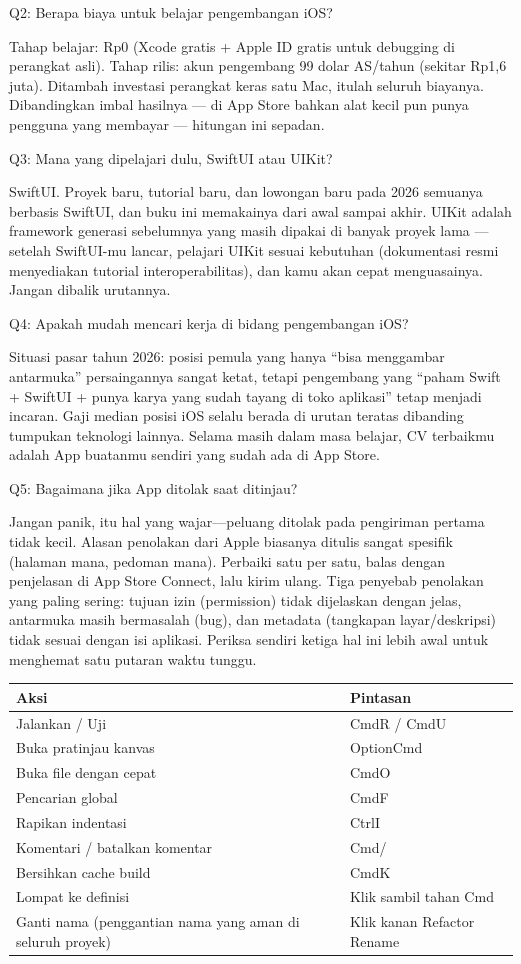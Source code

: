 Q2: Berapa biaya untuk belajar pengembangan iOS?

Tahap belajar: Rp0 (Xcode gratis + Apple ID gratis untuk debugging di perangkat asli). Tahap rilis: akun pengembang 99 dolar AS/tahun (sekitar Rp1,6 juta). Ditambah investasi perangkat keras satu Mac, itulah seluruh biayanya. Dibandingkan imbal hasilnya — di App Store bahkan alat kecil pun punya pengguna yang membayar — hitungan ini sepadan.

Q3: Mana yang dipelajari dulu, SwiftUI atau UIKit?

SwiftUI. Proyek baru, tutorial baru, dan lowongan baru pada 2026 semuanya berbasis SwiftUI, dan buku ini memakainya dari awal sampai akhir. UIKit adalah framework generasi sebelumnya yang masih dipakai di banyak proyek lama — setelah SwiftUI-mu lancar, pelajari UIKit sesuai kebutuhan (dokumentasi resmi menyediakan tutorial interoperabilitas), dan kamu akan cepat menguasainya. Jangan dibalik urutannya.

Q4: Apakah mudah mencari kerja di bidang pengembangan iOS?

Situasi pasar tahun 2026: posisi pemula yang hanya “bisa menggambar antarmuka” persaingannya sangat ketat, tetapi pengembang yang “paham Swift + SwiftUI + punya karya yang sudah tayang di toko aplikasi” tetap menjadi incaran. Gaji median posisi iOS selalu berada di urutan teratas dibanding tumpukan teknologi lainnya. Selama masih dalam masa belajar, CV terbaikmu adalah App buatanmu sendiri yang sudah ada di App Store.

Q5: Bagaimana jika App ditolak saat ditinjau?

Jangan panik, itu hal yang wajar—peluang ditolak pada pengiriman pertama tidak kecil. Alasan penolakan dari Apple biasanya ditulis sangat spesifik (halaman mana, pedoman mana). Perbaiki satu per satu, balas dengan penjelasan di App Store Connect, lalu kirim ulang. Tiga penyebab penolakan yang paling sering: tujuan izin (permission) tidak dijelaskan dengan jelas, antarmuka masih bermasalah (bug), dan metadata (tangkapan layar/deskripsi) tidak sesuai dengan isi aplikasi. Periksa sendiri ketiga hal ini lebih awal untuk menghemat satu putaran waktu tunggu.


\begin{center}
\begin{tabularx}{\linewidth}{|X|X|}
\hline
\textbf{Aksi} & \textbf{Pintasan} \tabularnewline
\hline
Jalankan / Uji & CmdR / CmdU \tabularnewline
Buka pratinjau kanvas & OptionCmd \tabularnewline
Buka file dengan cepat & CmdO \tabularnewline
Pencarian global & CmdF \tabularnewline
Rapikan indentasi & CtrlI \tabularnewline
Komentari / batalkan komentar & Cmd/ \tabularnewline
Bersihkan cache build & CmdK \tabularnewline
Lompat ke definisi & Klik sambil tahan Cmd \tabularnewline
Ganti nama (penggantian nama yang aman di seluruh proyek) & Klik kanan Refactor Rename \tabularnewline
\hline
\end{tabularx}
\end{center}

